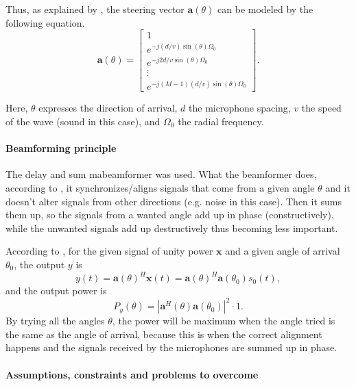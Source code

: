 Thus, as explained by \cite{IP3Man}, the steering vector \( \mathbf{a}(\theta) \) can be modeled by the following equation.
\[
 \mathbf{a}(\theta) = \begin{bmatrix}
1 \\
e^{-j(d/v)\sin(\theta)\Omega_0} \\
e^{-j2d/v\sin(\theta)\Omega_0} \\
\vdots \\
e^{-j(M-1)(d/v)\sin(\theta)\Omega_0}
\end{bmatrix}.
\]
\label{steering_vector_calculation}

Here, $\theta$ expresses the direction of arrival, $d$ the microphone spacing, $v$ the speed of the wave (sound in this case), and $\Omega_0$ the radial frequency.

\paragraph{Beamforming principle}
The delay and sum mabeamformer was used. What the beamformer does, according to \cite{IP3Man}, it synchronizes/aligns signals that come from a given angle $\theta$ and it doesn't alter signals from other directions (e.g. noise in this case). Then it sums them up, so the signals from a wanted angle add up in phase (constructively), while the unwanted signals add up destructively thus becoming less important.

According to \cite{IP3Man}, for the given signal of unity power $\mathbf{x}$ and a given angle of arrival $\theta_0$, the output $y$ is
\[
y(t) = \mathbf{a}(\theta)^H \mathbf{x}(t) = \mathbf{a}(\theta)^H \mathbf{a}(\theta_0) s_0(t),
\]
and the output power is
\[
P_y(\theta) = \left| \mathbf{a}^H(\theta)\mathbf{a}(\theta_0) \right|^2 \cdot 1.
\]
By trying all the angles $\theta$, the power will be maximum when the angle tried is the same as the angle of arrival, because this is when the correct alignment happens and the signals received by the microphones are summed up in phase. 



\paragraph{Assumptions, constraints and problems to overcome}\label{beamformer_assumption_constraints}


